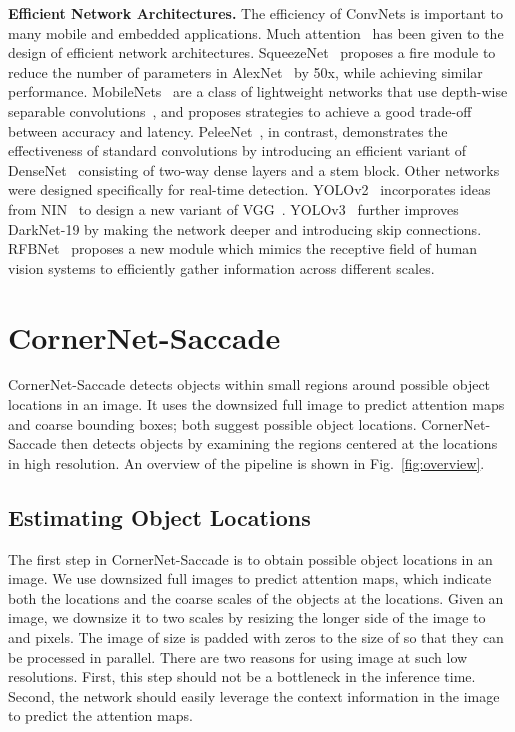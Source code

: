 \documentclass{bmvc2k}
\begin{document}
\smallskip \noindent \textbf{Efficient Network Architectures.} The efficiency of ConvNets is important to many mobile and embedded applications. Much attention~\cite{li2016pruning,rastegari2016xnor,zhang2018shufflenet,ma2018shufflenet,laube2018shufflenasnets,hu2018squeeze,sandler2018mobilenetv2} has been given to the design of efficient network architectures. SqueezeNet~\cite{iandola2016squeezenet} proposes a fire module to reduce the number of parameters in AlexNet~\cite{krizhevsky2012imagenet} by 50x, while achieving similar performance.  MobileNets~\cite{howard2017mobilenets} are a class of lightweight networks that use depth-wise separable convolutions~\cite{chollet2017xception}, and proposes strategies to achieve a good trade-off between accuracy and latency. PeleeNet~\cite{wang2018pelee}, in contrast, demonstrates the effectiveness of standard convolutions by introducing an efficient variant of DenseNet~\cite{huang2017densely} consisting of two-way dense layers and a stem block. Other networks were designed specifically for real-time detection. YOLOv2~\cite{redmon2017yolo9000} incorporates ideas from NIN~\cite{lin2013network} to design a new variant of VGG~\cite{simonyan2014very}. YOLOv3~\cite{redmon2018yolov3} further improves DarkNet-19 by making the network deeper and introducing skip connections. RFBNet~\cite{liu2018receptive} proposes a new module which mimics the receptive field of human vision systems to efficiently gather information across different scales.

\section{CornerNet-Saccade}
CornerNet-Saccade detects objects within small regions around possible object locations in an image. It uses the downsized full image to predict attention maps and coarse bounding boxes; both suggest possible object locations. CornerNet-Saccade then detects objects by examining the regions centered at the locations in high resolution. An overview of the pipeline is shown in Fig.~\ref{fig:overview}. 

\subsection{Estimating Object Locations}
The first step in CornerNet-Saccade is to obtain possible object locations in an image. We use downsized full images to predict attention maps, which indicate both the locations and the coarse scales of the objects at the locations. Given an image, we downsize it to two scales by resizing the longer side of the image to  and  pixels. The image of size  is padded with zeros to the size of  so that they can be processed in parallel. There are two reasons for using image at such low resolutions. First, this step should not be a bottleneck in the inference time. Second, the network should easily leverage the context information in the image to predict the attention maps.
\end{document}
